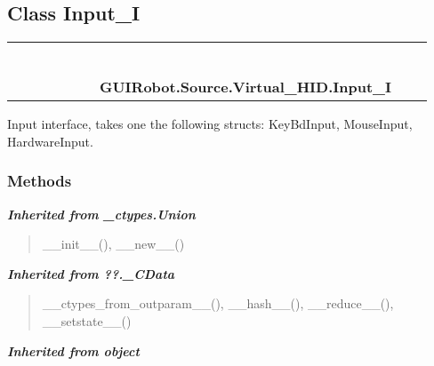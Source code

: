 \subsection{Class Input\_I}

    \label{GUIRobot:Source:Virtual_HID:Input_I}
\begin{tabular}{cccccccccc}
\multicolumn{2}{r}{\settowidth{\BCL}{object}\multirow{2}{\BCL}{object}}
&&
&&
&&
  \\\cline{3-3}
  &&\multicolumn{1}{c|}{}
&&
&&
&&
  \\
\multicolumn{4}{r}{\settowidth{\BCL}{??.\_CData}\multirow{2}{\BCL}{??.\_CData}}
&&
&&
  \\\cline{5-5}
  &&&&\multicolumn{1}{c|}{}
&&
&&
  \\
\multicolumn{6}{r}{\settowidth{\BCL}{\_ctypes.Union}\multirow{2}{\BCL}{\_ctypes.Union}}
&&
  \\\cline{7-7}
  &&&&&&\multicolumn{1}{c|}{}
&&
  \\
&&&&&&\multicolumn{2}{l}{\textbf{GUIRobot.Source.Virtual\_HID.Input\_I}}
\end{tabular}

Input interface, takes one the following structs: KeyBdInput, MouseInput, 
HardwareInput.



  \subsubsection{Methods}


\large{\textbf{\textit{Inherited from \_ctypes.Union}}}

\begin{quote}
\_\_init\_\_(), \_\_new\_\_()
\end{quote}

\large{\textbf{\textit{Inherited from ??.\_CData}}}

\begin{quote}
\_\_ctypes\_from\_outparam\_\_(), \_\_hash\_\_(), \_\_reduce\_\_(), \_\_setstate\_\_()
\end{quote}

\large{\textbf{\textit{Inherited from object}}}

